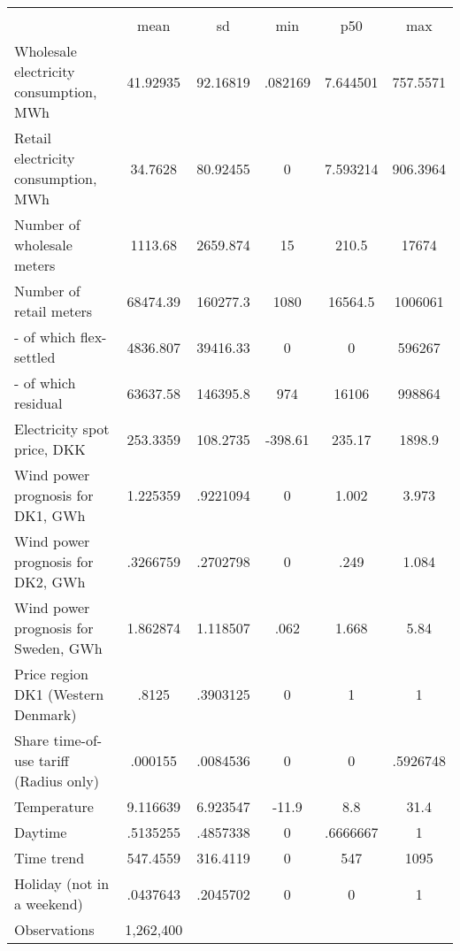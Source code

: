\begin{tabular}{l*{1}{ccccc}}
\hline
                    &\multicolumn{5}{c}{}                                            \\
                    &        mean&          sd&         min&         p50&         max\\
\midrule
Wholesale electricity consumption, MWh&    41.92935&    92.16819&     .082169&    7.644501&    757.5571\\
Retail electricity consumption, MWh&     34.7628&    80.92455&           0&    7.593214&    906.3964\\
Number of wholesale meters&     1113.68&    2659.874&          15&       210.5&       17674\\
Number of retail meters&    68474.39&    160277.3&        1080&     16564.5&     1006061\\
- of which flex-settled&    4836.807&    39416.33&           0&           0&      596267\\
- of which residual &    63637.58&    146395.8&         974&       16106&      998864\\
Electricity spot price, DKK&    253.3359&    108.2735&     -398.61&      235.17&      1898.9\\
Wind power prognosis for DK1, GWh&    1.225359&    .9221094&           0&       1.002&       3.973\\
Wind power prognosis for DK2, GWh&    .3266759&    .2702798&           0&        .249&       1.084\\
Wind power prognosis for Sweden, GWh&    1.862874&    1.118507&        .062&       1.668&        5.84\\
Price region DK1 (Western Denmark)&       .8125&    .3903125&           0&           1&           1\\
Share time-of-use tariff (Radius only)&     .000155&    .0084536&           0&           0&    .5926748\\
Temperature         &    9.116639&    6.923547&       -11.9&         8.8&        31.4\\
Daytime             &    .5135255&    .4857338&           0&    .6666667&           1\\
Time trend          &    547.4559&    316.4119&           0&         547&        1095\\
Holiday (not in a weekend)&    .0437643&    .2045702&           0&           0&           1\\
\midrule
Observations        &   1,262,400&            &            &            &            \\
\bottomrule\end{tabular}
